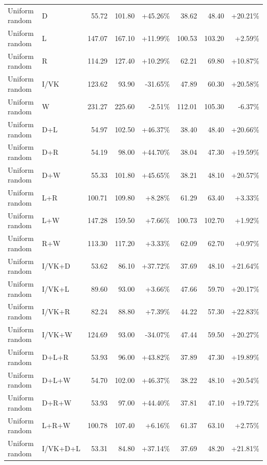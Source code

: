 \documentclass[UTF8,10pt]{ctexart}
\newcommand{\better}[1]{\textcolor{goodblue}{#1}}
\newcommand{\worse}[1]{\textcolor{badred}{#1}}
\begin{document}
{\begin{longtable}{llrrrrrr}
Uniform random & D & 55.72 & 101.80 & \better{+45.26\%} & 38.62 & 48.40 & \better{+20.21\%}\\
Uniform random & L & 147.07 & 167.10 & \better{+11.99\%} & 100.53 & 103.20 & \better{+2.59\%}\\
Uniform random & R & 114.29 & 127.40 & \better{+10.29\%} & 62.21 & 69.80 & \better{+10.87\%}\\
Uniform random & I/VK & 123.62 & 93.90 & \worse{-31.65\%} & 47.89 & 60.30 & \better{+20.58\%}\\
Uniform random & W & 231.27 & 225.60 & \worse{-2.51\%} & 112.01 & 105.30 & \worse{-6.37\%}\\
Uniform random & D+L & 54.97 & 102.50 & \better{+46.37\%} & 38.40 & 48.40 & \better{+20.66\%}\\
Uniform random & D+R & 54.19 & 98.00 & \better{+44.70\%} & 38.04 & 47.30 & \better{+19.59\%}\\
Uniform random & D+W & 55.33 & 101.80 & \better{+45.65\%} & 38.21 & 48.10 & \better{+20.57\%}\\
Uniform random & L+R & 100.71 & 109.80 & \better{+8.28\%} & 61.29 & 63.40 & \better{+3.33\%}\\
Uniform random & L+W & 147.28 & 159.50 & \better{+7.66\%} & 100.73 & 102.70 & \better{+1.92\%}\\
Uniform random & R+W & 113.30 & 117.20 & \better{+3.33\%} & 62.09 & 62.70 & \better{+0.97\%}\\
Uniform random & I/VK+D & 53.62 & 86.10 & \better{+37.72\%} & 37.69 & 48.10 & \better{+21.64\%}\\
Uniform random & I/VK+L & 89.60 & 93.00 & \better{+3.66\%} & 47.66 & 59.70 & \better{+20.17\%}\\
Uniform random & I/VK+R & 82.24 & 88.80 & \better{+7.39\%} & 44.22 & 57.30 & \better{+22.83\%}\\
Uniform random & I/VK+W & 124.69 & 93.00 & \worse{-34.07\%} & 47.44 & 59.50 & \better{+20.27\%}\\
Uniform random & D+L+R & 53.93 & 96.00 & \better{+43.82\%} & 37.89 & 47.30 & \better{+19.89\%}\\
Uniform random & D+L+W & 54.70 & 102.00 & \better{+46.37\%} & 38.22 & 48.10 & \better{+20.54\%}\\
Uniform random & D+R+W & 53.93 & 97.00 & \better{+44.40\%} & 37.81 & 47.10 & \better{+19.72\%}\\
Uniform random & L+R+W & 100.78 & 107.40 & \better{+6.16\%} & 61.37 & 63.10 & \better{+2.75\%}\\
Uniform random & I/VK+D+L & 53.31 & 84.80 & \better{+37.14\%} & 37.69 & 48.20 & \better{+21.81\%}\\

\end{longtable}}
\end{document}
